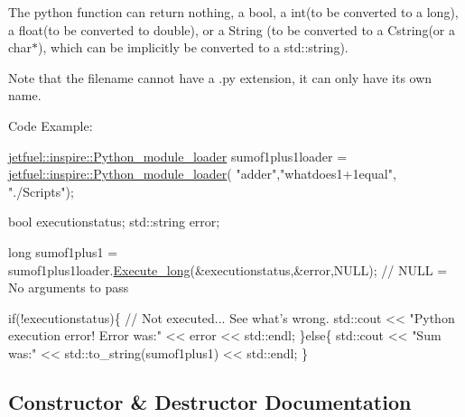 The python function can return nothing, a bool, a int(to be converted to a long), a float(to be converted to double), or a String (to be converted to a Cstring(or a char$\ast$), which can be implicitly be converted to a std\+::string).

Note that the filename cannot have a .py extension, it can only have it\textquotesingle{}s own name.

Code Example\+: 
\begin{DoxyCode}
\hyperlink{classjetfuel_1_1inspire_1_1Python__module__loader}{jetfuel::inspire::Python\_module\_loader} sumof1plus1loader = 
      \hyperlink{classjetfuel_1_1inspire_1_1Python__module__loader}{jetfuel::inspire::Python\_module\_loader}(
\textcolor{stringliteral}{"adder"},\textcolor{stringliteral}{"whatdoes1+1equal"},
\textcolor{stringliteral}{"./Scripts"});

\textcolor{keywordtype}{bool} executionstatus;
std::string error;

\textcolor{keywordtype}{long} sumof1plus1 = sumof1plus1loader.\hyperlink{classjetfuel_1_1inspire_1_1Python__module__loader_a7f1608c46e4d3c9f7a019f80a78c6756}{Execute\_long}(&executionstatus,&error,NULL);
\textcolor{comment}{// NULL = No arguments to pass}

\textcolor{keywordflow}{if}(!executionstatus)\{
    \textcolor{comment}{// Not executed... See what's wrong.}
    std::cout << \textcolor{stringliteral}{"Python execution error! Error was:"} << error << std::endl;
\}\textcolor{keywordflow}{else}\{
    std::cout << \textcolor{stringliteral}{"Sum was:"} << std::to\_string(sumof1plus1) << std::endl;
\}
\end{DoxyCode}
 

\subsection{Constructor \& Destructor Documentation}
\mbox{\label{classjetfuel_1_1inspire_1_1Python__module__loader_a30ab85906d5365ca34ca47b456460353}} 
